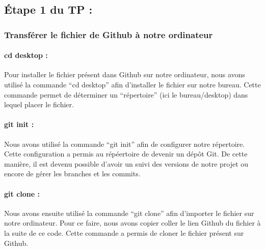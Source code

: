 \documentclass[
  letterpaper,
  DIV=11,
  numbers=noendperiod]{scrartcl}
\let\oldparagraph\paragraph
\renewcommand{\paragraph}[1]{\oldparagraph{#1}\mbox{}}
\begin{document}
\hypertarget{uxe9tape-1-du-tp}{%
\subsection{Étape 1 du TP :}\label{uxe9tape-1-du-tp}}

\hypertarget{transfuxe9rer-le-fichier-de-github-uxe0-notre-ordinateur}{%
\subsubsection{Transférer le fichier de Github à notre
ordinateur}\label{transfuxe9rer-le-fichier-de-github-uxe0-notre-ordinateur}}

\hypertarget{cd-desktop}{%
\paragraph{cd desktop :}\label{cd-desktop}}

Pour installer le fichier présent dans Github sur notre ordinateur, nous
avons utilisé la commande ``cd desktop'' afin d'installer le fichier sur
notre bureau. Cette commande permet de déterminer un ``répertoire'' (ici
le bureau/desktop) dans lequel placer le fichier.

\hypertarget{git-init}{%
\paragraph{git init :}\label{git-init}}

Nous avons utilisé la commande ``git init'' afin de configurer notre
répertoire. Cette configuration a permis au répéertoire de devenir un
dépôt Git. De cette manière, il est devenu possible d'avoir un suivi des
versions de notre projet ou encore de gérer les branches et les commits.

\hypertarget{git-clone}{%
\paragraph{git clone :}\label{git-clone}}

Nous avons ensuite utilisé la commande ``git clone'' afin d'importer le
fichier sur notre ordinateur. Pour ce faire, nous avons copier coller le
lien Github du fichier à la suite de ce code. Cette commande a permis de
cloner le fichier présent sur Github.

\hypertarget{section}{%
\subsection{}\label{section}}
\end{document}
